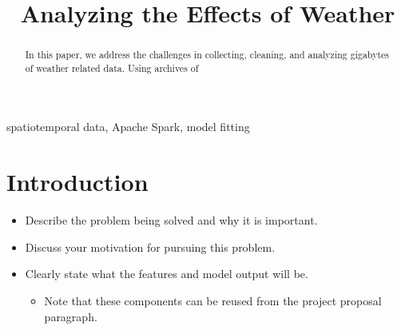\documentclass[conference]{IEEEtran}
\begin{document}
\title{Analyzing the Effects of Weather}
\author{
\and
{}
\and
{}
}

\maketitle

\begin{abstract}
In this paper, we address the challenges in collecting, cleaning, and analyzing gigabytes of weather related data. Using archives of
\end{abstract}

\begin{IEEEkeywords}
spatiotemporal data, Apache Spark, model fitting
\end{IEEEkeywords}

\section{Introduction}

\begin{itemize}
  \item Describe the problem being solved and why it is important.
  \item Discuss your motivation for pursuing this problem.
  \item Clearly state what the features and model output will be.
  \begin{itemize}
    \item Note that these components can be reused from the project proposal paragraph.
  \end{itemize}
\end{itemize}
\end{document}
